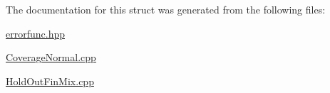 \-The documentation for this struct was generated from the following files\-:\begin{DoxyCompactItemize}
\item 
\hyperlink{errorfunc_8hpp}{errorfunc.\-hpp}\item 
\hyperlink{CoverageNormal_8cpp}{\-Coverage\-Normal.\-cpp}\item 
\hyperlink{HoldOutFinMix_8cpp}{\-Hold\-Out\-Fin\-Mix.\-cpp}\end{DoxyCompactItemize}
